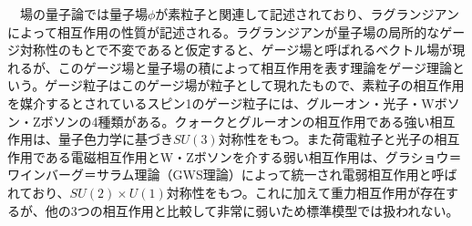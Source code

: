 　場の量子論では量子場$\phi$が素粒子と関連して記述されており、ラグランジアンによって相互作用の性質が記述される。ラグランジアンが量子場の局所的なゲージ対称性のもとで不変であると仮定すると、ゲージ場と呼ばれるベクトル場が現れるが、このゲージ場と量子場の積によって相互作用を表す理論をゲージ理論という。ゲージ粒子はこのゲージ場が粒子として現れたもので、素粒子の相互作用を媒介するとされているスピン1のゲージ粒子には、グルーオン・光子・Wボソン・Zボソンの4種類がある。クォークとグルーオンの相互作用である強い相互作用は、量子色力学に基づき$SU(3)$対称性をもつ。また荷電粒子と光子の相互作用である電磁相互作用とW・Zボソンを介する弱い相互作用は、グラショウ＝ワインバーグ＝サラム理論（GWS理論）によって統一され電弱相互作用と呼ばれており、$SU(2)\times U(1)$対称性をもつ。これに加えて重力相互作用が存在するが、他の3つの相互作用と比較して非常に弱いため標準模型では扱われない。\\
